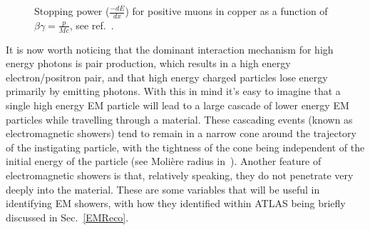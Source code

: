 \begin{figure}[!ht]
    \begin{center}
    \end{center}
        \caption[Stopping power for positive muons in copper.]
        {\small Stopping power ($\frac{-dE}{dx}$) for positive muons in copper as a function of $\beta\gamma=\frac{p}{Mc}$, see ref.~\cite{PDG}.} 
            \label{StoppingMuon}
\end{figure}

It is now worth noticing that the dominant interaction mechanism for high energy photons is pair production, which results in a high energy electron/positron pair, and that high energy charged particles lose energy primarily by emitting photons.  
With this in mind it's easy to imagine that a single high energy EM particle will lead to a large cascade of lower energy EM particles while travelling through a material.  
These cascading events (known as electromagnetic showers) tend to remain in a narrow cone around the trajectory of the instigating particle, with the tightness of the cone being independent of the initial energy of the particle (see Moli{\`e}re radius in~\cite{grupen_shwartz_2011}).  
Another feature of electromagnetic showers is that, relatively speaking, they do not penetrate very deeply into the material.   
These are some variables that will be useful in identifying EM showers, with how they identified within ATLAS being briefly discussed in Sec.~\ref{EMReco}. 

